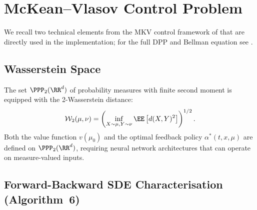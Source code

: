 \documentclass[11pt]{article}
\begin{document}





\newpage
\appendix

\section{McKean--Vlasov Control Problem}\label{sec:appendix-mkv}

We recall two technical elements from the MKV control framework of \citet{pham2024mfnn} that are directly used in the implementation; for the full DPP and Bellman equation see \citet{carmona2018mfg1}.

\subsection{Wasserstein Space}

The set $\PPP_2(\RR^d)$ of probability measures with finite second moment is equipped with the 2-Wasserstein distance:
\begin{equation}\label{eq:wasserstein}
  \mathcal{W}_2(\mu, \nu) = \left( \inf_{X \sim \mu, Y \sim \nu} \EE\left[ d(X, Y)^2 \right] \right)^{1/2}.
\end{equation}
Both the value function $v(\mu_0)$ and the optimal feedback policy $\alpha^*(t,x,\mu)$ are defined on $\PPP_2(\RR^d)$, requiring neural network architectures that can operate on measure-valued inputs.

\subsection{Forward-Backward SDE Characterisation (Algorithm~6)}
\end{document}

